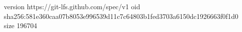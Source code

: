 version https://git-lfs.github.com/spec/v1
oid sha256:581e360caa07b8053e996539d11c7c64803b1fed3703a6150dc1926663f0f1d0
size 196704
